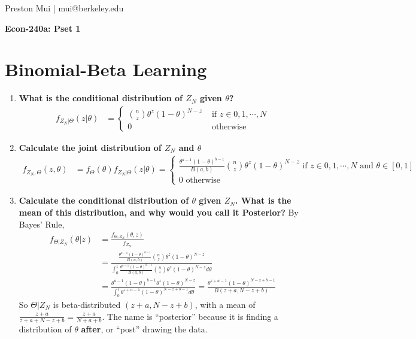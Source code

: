 \documentclass{article}[12pt]
\begin{document}
\begin{center}
	Preston Mui | mui@berkeley.edu

	{\bf Econ-240a: Pset 1}
\end{center}

\setcounter{section}{1}

\section{Binomial-Beta Learning}
\begin{enumerate}
	\item \textbf{What is the conditional distribution of $Z_N$ given $\theta$?}
	\begin{align*}
	    f_{Z_N | \Theta}(z | \theta) &= \begin{cases}
	    \binom{n}{z} \theta^z (1-\theta)^{N - z} &\mbox{ if $z \in 0, 1, \cdots, N$} \\
	    0 &\mbox{ otherwise}
	    \end{cases}
	\end{align*}

	\item \textbf{Calculate the joint distribution of $Z_N$ and $\theta$}
	\begin{align*}
	    f_{Z_N,\Theta}(z,\theta) &= f_{\Theta}(\theta) f_{Z_N | \Theta}(z|\theta) = \begin{cases} \frac{\theta^{a-1}(1-\theta)^{b-1}}{B(a,b)} \binom{n}{z} \theta^z (1-\theta)^{N - z} \mbox{ if $z \in 0, 1, \cdots, N$ and $\theta \in [0,1]$}\\ 0 \mbox{ otherwise} \end{cases}
	\end{align*}

	\item \textbf{Calculate the conditional distribution of $\theta$ given $Z_N$. What is the mean of this distribution, and why would you call it Posterior?} By Bayes' Rule,
	\begin{align*}
	    f_{\Theta | Z_N}(\theta | z) &= \frac{f_{\Theta, Z_N}(\theta,z)}{f_{Z_N}}\\
	    &= \frac{\frac{\theta^{a-1}(1-\theta)^{b-1}}{B(a,b)} \binom{n}{z} \theta^z (1-\theta)^{N - z}}{\int_{0}^{1} \frac{\theta^{a-1}(1-\theta)^{b-1}}{B(a,b)} \binom{n}{z} \theta^z (1-\theta)^{N - z} d\theta}\\
	    &= \frac{\theta^{a-1}(1-\theta)^{b-1} \theta^z (1-\theta)^{N - z}}{\int_{0}^{1} \theta^{z+a-1}(1-\theta)^{N-z+b-1} d\theta} = \frac{\theta^{z+a-1}(1-\theta)^{N-z+b-1}}{B(z+a,N-z+b)}
	\end{align*}
	So $\Theta | Z_N$ is beta-distributed $(z+a,N-z+b)$, with a mean of $\frac{z+a}{z+a+N-z+b} = \frac{z+a}{N+a+b}$. The name is ``posterior'' because it is finding a distribution of $\theta$ \textbf{after}, or ``post'' drawing the data.


\end{enumerate}
\end{document}
